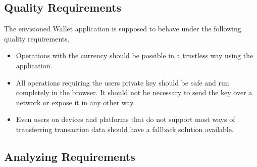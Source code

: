 \subsection{Quality Requirements}\label{qualityrequirements}
The envisioned Wallet application is supposed to behave under the following quality requirements. %
\begin{itemize}
\item Operations with the currency should be possible in a trustless way using the application.
\item All operations requiring the users private key should be safe and run completely in the browser. It should not be necessary to send the key over a network or expose it in any other way.
\item Even users on devices and platforms that do not support most ways of transferring transaction data should have a fallback solution available.

\end{itemize}
\subsection{Analyzing Requirements}

